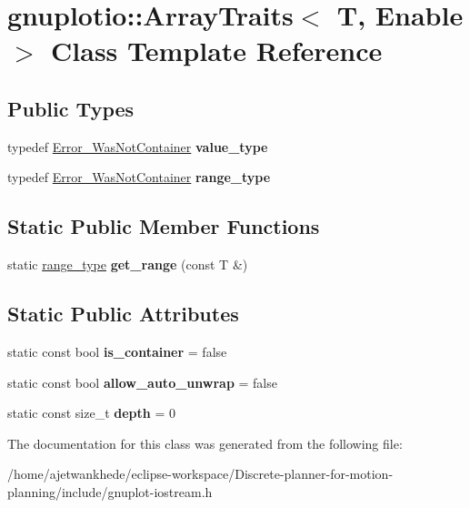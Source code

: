\hypertarget{classgnuplotio_1_1ArrayTraits}{}\section{gnuplotio\+:\+:Array\+Traits$<$ T, Enable $>$ Class Template Reference}
\label{classgnuplotio_1_1ArrayTraits}
\subsection*{Public Types}
\begin{DoxyCompactItemize}
\item 
\mbox{\label{classgnuplotio_1_1ArrayTraits_a3bcae12a7bf42af90f4946acc66f27e0}} 
typedef \mbox{\hyperlink{structgnuplotio_1_1Error__WasNotContainer}{Error\+\_\+\+Was\+Not\+Container}} {\bfseries value\+\_\+type}
\item 
\mbox{\label{classgnuplotio_1_1ArrayTraits_ae53464a5175c03deec403392b8dcb3c5}} 
typedef \mbox{\hyperlink{structgnuplotio_1_1Error__WasNotContainer}{Error\+\_\+\+Was\+Not\+Container}} {\bfseries range\+\_\+type}
\end{DoxyCompactItemize}
\subsection*{Static Public Member Functions}
\begin{DoxyCompactItemize}
\item 
\mbox{\label{classgnuplotio_1_1ArrayTraits_aee31432f330f9f9e4f5af628641181f7}} 
static \mbox{\hyperlink{structgnuplotio_1_1Error__WasNotContainer}{range\+\_\+type}} {\bfseries get\+\_\+range} (const T \&)
\end{DoxyCompactItemize}
\subsection*{Static Public Attributes}
\begin{DoxyCompactItemize}
\item 
\mbox{\label{classgnuplotio_1_1ArrayTraits_ac5d19b25086565613c305960bd9d4a78}} 
static const bool {\bfseries is\+\_\+container} = false
\item 
\mbox{\label{classgnuplotio_1_1ArrayTraits_a354d64663551a34c36c5fa7823859668}} 
static const bool {\bfseries allow\+\_\+auto\+\_\+unwrap} = false
\item 
\mbox{\label{classgnuplotio_1_1ArrayTraits_a6fbd8c815e595f4efbcafd9b0eeb06f2}} 
static const size\+\_\+t {\bfseries depth} = 0
\end{DoxyCompactItemize}


The documentation for this class was generated from the following file\+:\begin{DoxyCompactItemize}
\item 
/home/ajetwankhede/eclipse-\/workspace/\+Discrete-\/planner-\/for-\/motion-\/planning/include/gnuplot-\/iostream.\+h\end{DoxyCompactItemize}
